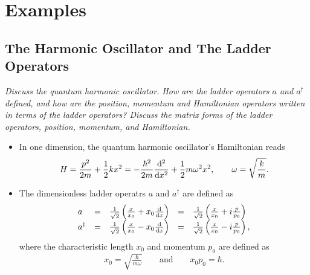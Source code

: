 \documentclass[11pt, a4paper]{article}
\newcommand{\Ham}{Hamiltonian\xspace}
\begin{document}
\section{Examples}
\subsection{The Harmonic Oscillator and The Ladder Operators}
\textit{Discuss the quantum harmonic oscillator. How are the ladder operators $ a $ and $ a^{\dagger} $ defined, and how are the position, momentum and \Ham operators written in terms of the ladder operators? Discuss the matrix forms of the ladder operators, position, momentum, and \Ham.}

\begin{itemize}

	\item In one dimension, the quantum harmonic oscillator's Hamiltonian reads
	\begin{equation*}
		H = \frac{p^{2}}{2m} + \frac{1}{2}kx^{2} = - \frac{\hbar^{2}}{2m}\dv[2]{}{x} + \frac{1}{2}m \omega^{2}x^{2}, \qquad \omega = \sqrt{\frac{k}{m}}.
	\end{equation*}

    \item The dimensionless ladder operatrs $ a $ and $ a^{\dagger} $ are defined as
    \begin{equation*}
        \begin{array}{lclcl}
            a & = & \frac{1}{\sqrt{2}}\left(\frac{x}{x_{0}} + x_{0} \dv{x}\right) & = & \frac{1}{\sqrt{2}} \left( \frac{x}{x_{0}} + i \frac{p}{p_{0}} \right)\\
            a^{\dagger} & = & \frac{1}{\sqrt{2}}\left(\frac{x}{x_{0}} - x_{0} \dv{x}\right) & = & \frac{1}{\sqrt{2}} \left( \frac{x}{x_{0}} - i \frac{p}{p_{0}} \right),
        \end{array}
    \end{equation*}
    where the characteristic length $ x_{0} $ and momentum $ p_{0} $ are defined as
    \begin{equation*}
        x_{0} = \sqrt{\tfrac{\hbar}{m \omega}} \qquad \text{and} \qquad x_{0} p_{0} = \hbar.
    \end{equation*}


\end{itemize}
\end{document}

